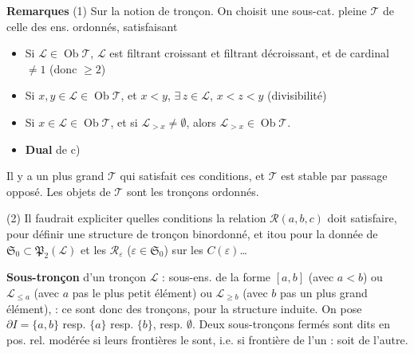 \documentclass[11pt,a4paper]{article}
\begin{document}
\textbf{Remarques} (1)  Sur la notion de tronçon. On choisit une sous-cat. pleine $\mathcal{T}$ de celle des ens. ordonnés, satisfaisant
\begin{itemize}
  \item[a)] Si $\mathcal{L} \in \operatorname{Ob} \mathcal{T}$, $\mathcal{L}$ est filtrant croissant et filtrant décroissant, et de cardinal $\neq 1$  (donc $\geq 2$)
  \item[b)] Si $x, y \in \mathcal{L} \in \operatorname{Ob} \mathcal{T}$, et $x < y$, $\exists\, z \in \mathcal{L}$, $x < z < y$ (divisibilité)
  \item[c)] Si $x \in \mathcal{L} \in \operatorname{Ob} \mathcal{T}$,  et si $\mathcal{L}_{>x} \neq \emptyset$, alors $\mathcal{L}_{>x} \in \operatorname{Ob} \mathcal{T}$.
  \item[c')] \textbf{Dual} de c)
\end{itemize}
Il y a un plus grand $\mathcal{T}$ qui satisfait ces conditions, et $\mathcal{T}$ est stable par passage  opposé. Les objets de $\mathcal{T}$ sont les tronçons ordonnés.

(2) Il faudrait expliciter quelles conditions la relation $\mathcal{R}(a,b,c)$ doit satisfaire, pour définir une structure de  tronçon binordonné, et itou pour la donnée de $\mathfrak{S}_0 \subset \mathfrak{P}_2(\mathcal{L})$ et les $\mathcal{R}_\varepsilon$ ($\varepsilon \in \mathfrak{S}_0$) sur les $C(\varepsilon)$…

\textbf{Sous-tronçon}  d'un tronçon $\mathcal{L}$ : sous-ens. de la forme $[a,b]$ (avec $a < b$) ou $\mathcal{L}_{\leq a}$ (avec $a$ pas le plus petit élément) ou $\mathcal{L}_{\geq b}$ (avec $b$ pas un plus grand élément),  : ce sont donc des tronçons, pour la structure induite. On pose $\partial I = \{a,b\}$ resp. $\{a\}$ resp. $\{b\}$, resp. $\emptyset$.  Deux sous-tronçons fermés sont dits en pos. rel. modérée si leurs frontières le sont, i.e. si \ill{} frontière de l'un \ill{}  \ill{} : soit \ill{} de l'autre.
\marginal{\ill{}}

\end{document}
